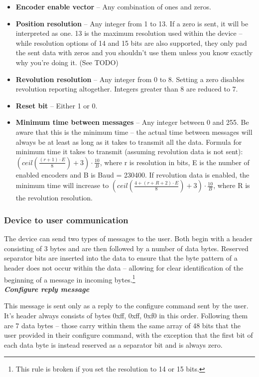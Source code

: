 \documentclass[twoside]{article}
\begin{document}
\begin{itemize}
\item \textbf{Encoder enable vector} -- Any combination of ones and zeros.
\item \textbf{Position resolution} -- Any integer from 1 to 13. If a zero is sent, it will be interpreted as one. 13 is the maximum resolution used within the device -- while resolution options of 14 and 15 bits are also supported, they only pad the sent data with zeros and you shouldn't use them unless you know exactly why you're doing it. (See TODO)
\item \textbf{Revolution resolution} -- Any integer from 0 to 8. Setting a zero disables revolution reporting altogether. Integers greater than 8 are reduced to 7.
\item \textbf{Reset bit} -- Either 1 or 0.
\item \textbf{Minimum time between messages} -- Any integer between 0 and 255. Be aware that this is the minimum time -- the actual time between messages will always be at least as long as it takes to transmit all the data. Formula for minimum time it takes to transmit (assuming revolution data is not sent): $(ceil(\frac{(r+1)\cdot{}E}{8}) + 3)\cdot{}\frac{10}{B}$, where r is resolution in bits, E is the number of enabled encoders and B is Baud = 230400. If revolution data is enabled, the minimum time will increase to  $(ceil(\frac{4+(r+R+2)\cdot{}E}{8}) + 3)\cdot{}\frac{10}{B}$, where R is the revolution resolution.
\end{itemize}


\subsubsection{Device to user communication}

The device can send two types of messages to the user. Both begin with a header consisting of 3 bytes and are then followed by a number of data bytes. Reserved separator bits are inserted into the data to ensure that the byte pattern of a header does not occur within the data -- allowing for clear identification of the beginning of a message in incoming bytes.\footnote{This rule is broken if you set the resolution to 14 or 15 bits.} \\

\noindent\emph{\textbf{Configure reply message}}

This message is sent only as a reply to the configure command sent by the user. It's header always consists of bytes 0xff, 0xff, 0xf0 in this order. Following them are 7 data bytes -- those carry within them the same array of 48 bits that the user provided in their configure command, with the exception that the first bit of each data byte is instead reserved as a separator bit and is always zero.
\end{document}
